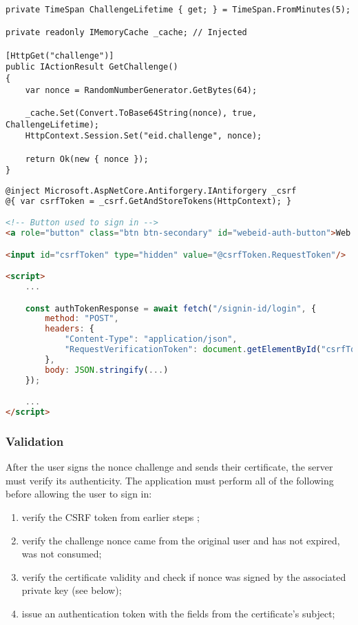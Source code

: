 \begin{lstlisting}[caption={Web eID Challenge Endpoint}, label={lst:web-eid-challenge}]
private TimeSpan ChallengeLifetime { get; } = TimeSpan.FromMinutes(5);

private readonly IMemoryCache _cache; // Injected

[HttpGet("challenge")]
public IActionResult GetChallenge()
{
    var nonce = RandomNumberGenerator.GetBytes(64);

    _cache.Set(Convert.ToBase64String(nonce), true, ChallengeLifetime);
    HttpContext.Session.Set("eid.challenge", nonce);

    return Ok(new { nonce });
}
\end{lstlisting}


\begin{lstlisting}[caption={Web eID UI excerpt}, label={lst:web-eid-challenge-ui}, language={html}]
@inject Microsoft.AspNetCore.Antiforgery.IAntiforgery _csrf
@{ var csrfToken = _csrf.GetAndStoreTokens(HttpContext); }

<!-- Button used to sign in -->
<a role="button" class="btn btn-secondary" id="webeid-auth-button">Web eID</a>

<input id="csrfToken" type="hidden" value="@csrfToken.RequestToken"/>

<script>
    ...

    const authTokenResponse = await fetch("/signin-id/login", {
        method: "POST",
        headers: {
            "Content-Type": "application/json",
            "RequestVerificationToken": document.getElementById("csrfToken").value
        },
        body: JSON.stringify(...)
    });

    ...
</script>
\end{lstlisting}

\subsubsection{Validation}

After the user signs the nonce challenge and sends their certificate, the server must verify its authenticity. The application must perform all of the following before allowing the user to sign in:

\begin{enumerate}
  \item verify the CSRF token from earlier steps \cite{ria-webeid-source-web-eid-authtoken-validation-java-readme};
  \item verify the challenge nonce came from the original user and has not expired, was not consumed;
  \item verify the certificate validity and check if nonce was signed by the associated private key (see below);
  \item issue an authentication token with the fields from the certificate's subject;
\end{enumerate}

